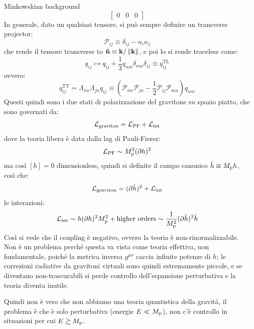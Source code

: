 \begin{example}{Minkowskian background}{}
\begin{equation*}
\begin{bmatrix}
      0 & 0 & 0
    \end{bmatrix}
  \end{equation*}
  In generale, dato un qualsiasi tensore, si può sempre definire un transverse projector:
  \begin{equation*}
    \mathcal{P}_{ij} \equiv \delta_{ij} - n_i n_j
  \end{equation*}
  che rende il tensore transverse to $ \mathbf{\hat{n}} \equiv \mathbf{k} / \left\lVert\mathbf{k}\right\rVert $, e poi lo si rende traceless come:
  \begin{equation*}
    q_{ij} \mapsto q_{ij} + \frac{1}{3} q_{nm} \delta_{nm} \delta_{ij} \equiv q^\text{TL}_{ij}
  \end{equation*}
  ovvero:
  \begin{equation*}
    q^\text{TT}_{ij} = \Lambda_{im} \Lambda_{jn} q_{ij} \equiv \left( \mathcal{P}_{im} \mathcal{P}_{jn} - \frac{1}{2} \mathcal{P}_{ij} \mathcal{P}_{mn} \right) q_{nm}
  \end{equation*}
  Questi quindi sono i due stati di polarizzazione del gravitone su spazio piatto, che sono governati da:
  \begin{equation*}
    \mathcal{L}_\text{graviton} = \mathcal{L}_\text{PF} + \mathcal{L}_\text{int}
  \end{equation*}
  dove la teoria libera è data dalla lag di Pauli-Fiersz:
  \begin{equation*}
    \mathcal{L}_\text{PF} \sim M_\text{p}^2 (\partial h)^2
  \end{equation*}
  ma così $ [h] = 0 $ dimensionless, quindi si definite il campo canonico $ \hat{h} \equiv M_\text{p} h $, così che:
  \begin{equation*}
    \mathcal{L}_\text{graviton} = (\partial \hat{h})^2 + \mathcal{L}_\text{int}
  \end{equation*}
  le interazioni:
  \begin{equation*}
    \mathcal{L}_\text{int} \sim h (\partial h)^2 M_\text{p}^2 + \text{higher orders} \sim \frac{1}{M_\text{p}^2} (\partial \hat{h})^2 \hat{h}
  \end{equation*}
  Così si vede che il coupling è negativo, ovvero la teoria è non-rinormalizzabile. Non è un problema perché questa va vista come teoria effettiva, non fondamentale, poiché la metrica inversa $ g^{\mu \nu} $ caccia infinite potenze di $ h $; le correzioni radiative da gravitoni virtuali sono quindi estremamente piccole, e se diventano non-trascurabili si perde controllo dell'espansione perturbativa e la teoria diventa inutile.

  Quindi non è vero che non abbiamo una teoria quantistica della gravità, il problema è che è solo perturbativa (energie $ E \ll M_\text{p} $), non c'è controllo in situazioni per cui $ E \gtrsim M_\text{p} $.
\end{example}

